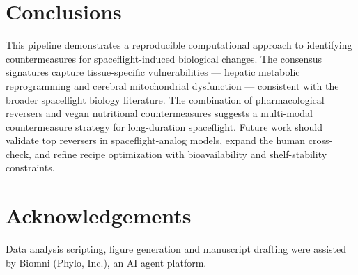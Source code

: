 \documentclass[11pt,a4paper]{article}
\begin{document}
\section{Conclusions}

This pipeline demonstrates a reproducible computational approach to identifying countermeasures for 
spaceflight-induced biological changes. The consensus signatures capture tissue-specific 
vulnerabilities --- hepatic metabolic reprogramming and cerebral mitochondrial dysfunction --- 
consistent with the broader spaceflight biology literature. The combination of pharmacological 
reversers and vegan nutritional countermeasures suggests a multi-modal countermeasure strategy for 
long-duration spaceflight. Future work should validate top reversers in spaceflight-analog models, 
expand the human cross-check, and refine recipe optimization with bioavailability and shelf-stability 
constraints.

\section*{Acknowledgements}

Data analysis scripting, figure generation and manuscript drafting were assisted by Biomni (Phylo, Inc.), an AI agent platform.
\end{document}
